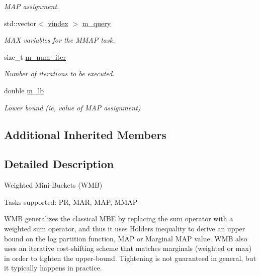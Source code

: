 \begin{DoxyCompactItemize}
\begin{DoxyCompactList}\small\item\em M\+A\+P assignment. \end{DoxyCompactList}\item 
\hypertarget{classmerlin_1_1wmb_a371fef243f301501c4c4ab66110d6e4f}{}std\+::vector$<$ \hyperlink{classmerlin_1_1wmb_ab942720d1c65e0002674af4eeade660f}{vindex} $>$ \hyperlink{classmerlin_1_1wmb_a371fef243f301501c4c4ab66110d6e4f}{m\+\_\+query}\label{classmerlin_1_1wmb_a371fef243f301501c4c4ab66110d6e4f}

\begin{DoxyCompactList}\small\item\em M\+A\+X variables for the M\+M\+A\+P task. \end{DoxyCompactList}\item 
\hypertarget{classmerlin_1_1wmb_a743ab793f808e44b021f7e811df3521b}{}size\+\_\+t \hyperlink{classmerlin_1_1wmb_a743ab793f808e44b021f7e811df3521b}{m\+\_\+num\+\_\+iter}\label{classmerlin_1_1wmb_a743ab793f808e44b021f7e811df3521b}

\begin{DoxyCompactList}\small\item\em Number of iterations to be executed. \end{DoxyCompactList}\item 
\hypertarget{classmerlin_1_1wmb_a68bc2a7e87eeab1021bf1877a3b200c6}{}double \hyperlink{classmerlin_1_1wmb_a68bc2a7e87eeab1021bf1877a3b200c6}{m\+\_\+lb}\label{classmerlin_1_1wmb_a68bc2a7e87eeab1021bf1877a3b200c6}

\begin{DoxyCompactList}\small\item\em Lower bound (ie, value of M\+A\+P assignment) \end{DoxyCompactList}\end{DoxyCompactItemize}
\subsection*{Additional Inherited Members}


\subsection{Detailed Description}
Weighted Mini-\/\+Buckets (W\+M\+B)

Tasks supported\+: P\+R, M\+A\+R, M\+A\+P, M\+M\+A\+P

W\+M\+B generalizes the classical M\+B\+E by replacing the sum operator with a weighted sum operator, and thus it uses Holder\textquotesingle{}s inequality to derive an upper bound on the log partition function, M\+A\+P or Marginal M\+A\+P value. W\+M\+B also uses an iterative cost-\/shifting scheme that matches marginals (weighted or max) in order to tighten the upper-\/bound. Tightening is not guaranteed in general, but it typically happens in practice. 

